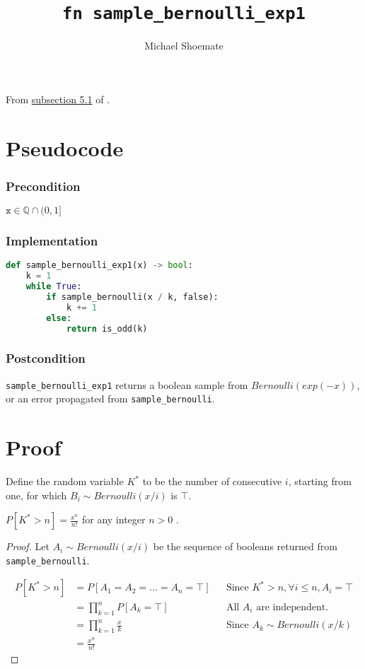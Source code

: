 \documentclass{article}
\title{\texttt{fn sample\_bernoulli\_exp1}}
\author{Michael Shoemate}
\begin{document}
\maketitle

From \href{https://arxiv.org/pdf/2004.00010.pdf#subsection.5.1}{subsection 5.1} of \cite{CKS20}.

\section{Pseudocode}
\subsubsection*{Precondition}
$\texttt{x} \in \mathbb{Q} \cap (0, 1]$

\subsubsection*{Implementation}        
\begin{lstlisting}[language=Python]
def sample_bernoulli_exp1(x) -> bool:
    k = 1
    while True:
        if sample_bernoulli(x / k, false):
            k += 1
        else: 
            return is_odd(k)
\end{lstlisting}

\subsubsection*{Postcondition}
\texttt{sample\_bernoulli\_exp1} returns a boolean sample from $Bernoulli(exp(-x))$, or an error propagated from \texttt{sample\_bernoulli}.

\section{Proof}

Define the random variable $K^{*}$ to be the number of consecutive $i$, starting from one, for which $B_i \sim Bernoulli(x/i)$ is $\top$.

\begin{lemma}
\label{P_K_gt_n}
$P[K^{*} > n] = \frac{x^n}{n!}$ for any integer $n > 0$ \cite{CKS20}.
\end{lemma}

\begin{proof}
Let $A_i \sim Bernoulli(x/i)$ be the sequence of booleans returned from \texttt{sample\_bernoulli}.

\begin{align*}
    P[K^{*} > n] &= P[A_1 = A_2 = ... = A_n = \top] && \text{Since } K^{*} > n, \forall i \leq n, A_i = \top \\
    &= \prod_{k=1}^n P[A_k = \top] && \text{All $A_i$ are independent.} \\
    &= \prod_{k=1}^n \frac{x}{k} && \text{Since $A_k \sim Bernoulli(x/k)$} \\
    &= \frac{x^n}{n!}
\end{align*}
\end{proof}
\end{document}

